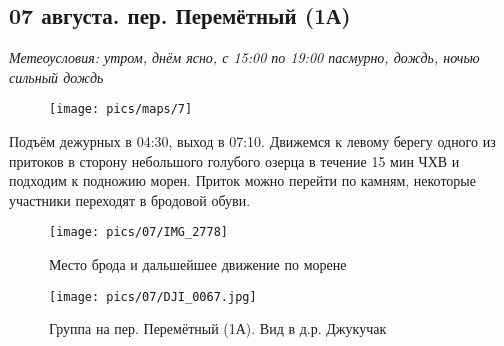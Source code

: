 \subsection{07 августа. пер. Перемётный (1А)}
\textit{Метеоусловия: утром, днём ясно, с 15:00 по 19:00 пасмурно, дождь, ночью сильный дождь}

\begin{figure}[h!]
	\centering
	\texttt{[image: pics/maps/7]}
	\label{fig:mini_18}
\end{figure}

Подъём дежурных в 04:30, выход в 07:10. Движемся к левому берегу одного из притоков в сторону небольшого голубого озерца в течение 15 мин ЧХВ и подходим к подножию морен. Приток можно перейти по камням, некоторые участники переходят в бродовой обуви.

\begin{figure}[h!]
	\centering
	\texttt{[image: pics/07/IMG\_2778]}
	\caption{Место брода и дальшейшее движение по морене}
	\label{fig:img2778}
\end{figure}

\begin{figure}[h!]
	\centering
	\texttt{[image: pics/07/DJI\_0067.jpg]}
	\caption{Группа на пер. Перемётный (1А). Вид в д.р. Джукучак}
	\label{fig:DJI_0067.jpg}
\end{figure}


\clearpage
